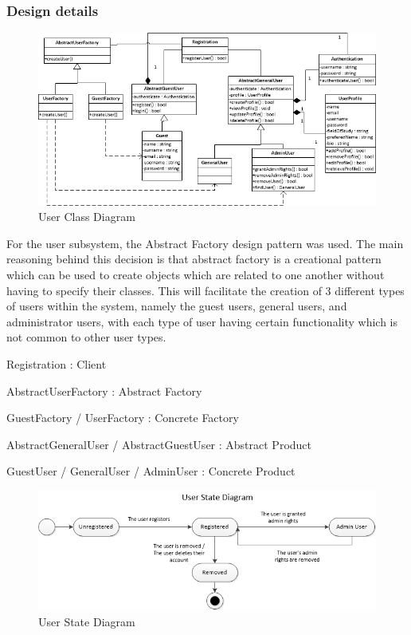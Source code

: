 \documentclass{article}
\begin{document}
	\clearpage
	
\subsubsection{Design details}

	\begin{figure}[h!]
      \includegraphics[width=\textwidth]{User_Subsystem_Class_Diagram.png}
      \caption{User Class Diagram}
    \end{figure}
    
    \begin{flushleft}
    
    For the user subsystem, the Abstract Factory design pattern was used. The main reasoning behind this decision is that abstract factory is a creational pattern which can be used to create objects which are related to one another without having to specify their classes. This will facilitate the creation of 3 different types of users within the system, namely the guest users, general users, and administrator users, with each type of user having certain functionality which is not common to other user types.
    
     \bigskip
     
    Registration : Client

AbstractUserFactory : Abstract Factory

GuestFactory / UserFactory : Concrete Factory

AbstractGeneralUser / AbstractGuestUser : Abstract Product

GuestUser / GeneralUser / AdminUser : Concrete Product

\end{flushleft}

	\begin{figure}[h!]
      \includegraphics[width=\textwidth]{User_State_Diagram.png}
      \caption{User State Diagram}
    \end{figure}
\end{document}
